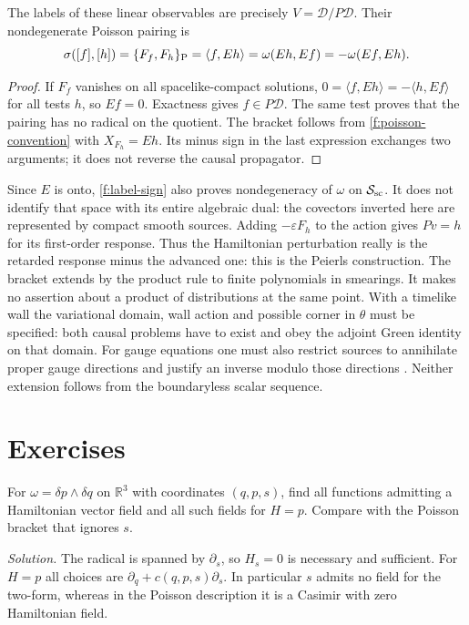 \begin{corollary}\label{f:peierls-labels}
The labels of these linear observables are precisely $V=\mathcal D/P\mathcal D$. Their nondegenerate Poisson pairing is
\begin{equation}
 \sigma([f],[h])=\{F_f,F_h\}_{\rm P}=\langle f,Eh\rangle
          =\omega(Eh,Ef)=-\omega(Ef,Eh).
 \label{f:label-sign}
\end{equation}
\end{corollary}
\begin{proof}
If $F_f$ vanishes on all spacelike-compact solutions, $0=\langle f,Eh\rangle=-\langle h,Ef\rangle$ for all tests $h$, so $Ef=0$. Exactness gives $f\in P\mathcal D$. The same test proves that the pairing has no radical on the quotient. The bracket follows from \eqref{f:poisson-convention} with $X_{F_h}=Eh$. Its minus sign in the last expression exchanges two arguments; it does not reverse the causal propagator.
\end{proof}
Since $E$ is onto, \eqref{f:label-sign} also proves nondegeneracy of $\omega$ on $\mathcal S_{\rm sc}$. It does not identify that space with its entire algebraic dual: the covectors inverted here are represented by compact smooth sources. Adding $-\varepsilon F_h$ to the action gives $Pv=h$ for its first-order response. Thus the Hamiltonian perturbation really is the retarded response minus the advanced one: this is the Peierls construction. The bracket extends by the product rule to finite polynomials in smearings. It makes no assertion about a product of distributions at the same point. With a timelike wall the variational domain, wall action and possible corner in $\theta$ must be specified: both causal problems have to exist and obey the adjoint Green identity on that domain. For gauge equations one must also restrict sources to annihilate proper gauge directions and justify an inverse modulo those directions \cite{Khavkine}. Neither extension follows from the boundaryless scalar sequence.

\section*{Exercises}
\begin{exercise}\label{f:ex-null-coordinate}
For $\omega=\delta p\wedge\delta q$ on $\mathbb R^3$ with coordinates $(q,p,s)$, find all functions admitting a Hamiltonian vector field and all such fields for $H=p$. Compare with the Poisson bracket that ignores $s$.
\end{exercise}
\noindent\emph{Solution.} The radical is spanned by $\partial_s$, so $H_s=0$ is necessary and sufficient. For $H=p$ all choices are $\partial_q+c(q,p,s)\partial_s$. In particular $s$ admits no field for the two-form, whereas in the Poisson description it is a Casimir with zero Hamiltonian field.

